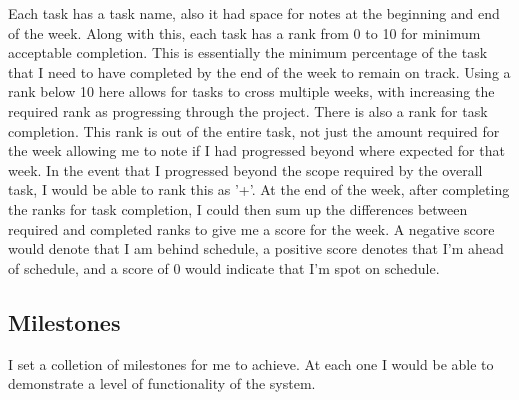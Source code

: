 Each task has a task name, also it had space for notes at the beginning and end of the week. Along with this, each task has a rank from 0 to 10 for minimum acceptable completion. This is essentially the minimum percentage of the task that I need to have completed by the end of the week to remain on track. Using a rank below 10 here allows for tasks to cross multiple weeks, with increasing the required rank as progressing through the project.
There is also a rank for task completion. This rank is out of the entire task, not just the amount required for the week allowing me to note if I had progressed beyond where expected for that week. In the event that I progressed beyond the scope required by the overall task, I would be able to rank this as '+'.
At the end of the week, after completing the ranks for task completion, I could then sum up the differences between required and completed ranks to give me a score for the week.
A negative score would denote that I am behind schedule, a positive score denotes that I'm ahead of schedule, and a score of 0 would indicate that I'm spot on schedule.

\subsection{Milestones}
I set a colletion of milestones for me to achieve. At each one I would be able to demonstrate a level of functionality of the system.
